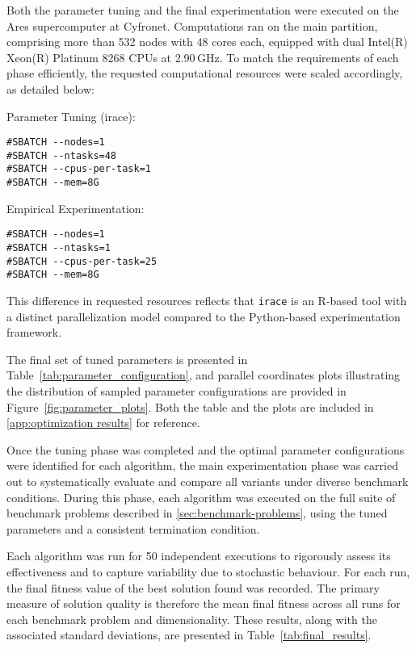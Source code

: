 {Both the parameter tuning and the final experimentation were executed on the Ares supercomputer at Cyfronet. Computations ran on the main partition, comprising more than 532 nodes with 48 cores each, equipped with dual Intel(R) Xeon(R) Platinum 8268 CPUs at 2.90\,GHz. To match the requirements of each phase efficiently, the requested computational resources were scaled accordingly, as detailed below:

\vspace{.835em}
\begin{tcbraster}[
    raster columns=2, 
    raster equal height, 
    nobeforeafter, 
    raster column skip=2cm
]
\begin{blkblock}{Parameter Tuning (irace):}
    \begin{verbatim}#SBATCH --nodes=1
#SBATCH --ntasks=48
#SBATCH --cpus-per-task=1
#SBATCH --mem=8G\end{verbatim}
\end{blkblock}
\begin{blkblock}{Empirical Experimentation:}
    \begin{verbatim}#SBATCH --nodes=1
#SBATCH --ntasks=1
#SBATCH --cpus-per-task=25
#SBATCH --mem=8G\end{verbatim}
\end{blkblock}
\end{tcbraster}
\vspace{.835em}

\noindent This difference in requested resources reflects that \texttt{irace} is an R-based tool with a distinct parallelization model compared to the Python-based experimentation framework.

The final set of tuned parameters is presented in Table~\ref{tab:parameter_configuration}, and parallel coordinates plots illustrating the distribution of sampled parameter configurations are provided in Figure~\ref{fig:parameter_plots}. Both the table and the plots are included in \autoref{app:optimization results} for reference.

Once the tuning phase was completed and the optimal parameter configurations were identified for each algorithm, the main experimentation phase was carried out to systematically evaluate and compare all variants under diverse benchmark conditions. During this phase, each algorithm was executed on the full suite of benchmark problems described in \autoref{sec:benchmark-problems}, using the tuned parameters and a consistent termination condition.

Each algorithm was run for 50 independent executions to rigorously assess its effectiveness and to capture variability due to stochastic behaviour. For each run, the final fitness value of the best solution found was recorded. The primary measure of solution quality is therefore the mean final fitness across all runs for each benchmark problem and dimensionality. These results, along with the associated standard deviations, are presented in Table~\ref{tab:final_results}.

}
